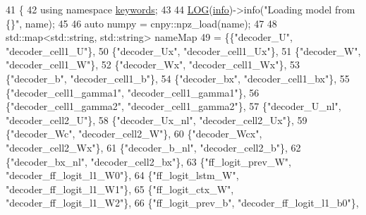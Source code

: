 \begin{DoxyCode}
41                                                                \{
42     \textcolor{keyword}{using namespace }\hyperlink{namespacekeywords}{keywords};
43 
44     \hyperlink{amun_2common_2logging_8h_a8cad147aca8c526d3c8a03ae14d5c87d}{LOG}(\hyperlink{namespacefix__hard_a31eedbb056537bc1bef47ad5e40eaa68}{info})->info(\textcolor{stringliteral}{"Loading model from \{\}"}, name);
45 
46     \textcolor{keyword}{auto} numpy = cnpy::npz\_load(name);
47 
48     std::map<std::string, std::string> nameMap
49         = \{\{\textcolor{stringliteral}{"decoder\_U"}, \textcolor{stringliteral}{"decoder\_cell1\_U"}\},
50            \{\textcolor{stringliteral}{"decoder\_Ux"}, \textcolor{stringliteral}{"decoder\_cell1\_Ux"}\},
51            \{\textcolor{stringliteral}{"decoder\_W"}, \textcolor{stringliteral}{"decoder\_cell1\_W"}\},
52            \{\textcolor{stringliteral}{"decoder\_Wx"}, \textcolor{stringliteral}{"decoder\_cell1\_Wx"}\},
53            \{\textcolor{stringliteral}{"decoder\_b"}, \textcolor{stringliteral}{"decoder\_cell1\_b"}\},
54            \{\textcolor{stringliteral}{"decoder\_bx"}, \textcolor{stringliteral}{"decoder\_cell1\_bx"}\},
55            \{\textcolor{stringliteral}{"decoder\_cell1\_gamma1"}, \textcolor{stringliteral}{"decoder\_cell1\_gamma1"}\},
56            \{\textcolor{stringliteral}{"decoder\_cell1\_gamma2"}, \textcolor{stringliteral}{"decoder\_cell1\_gamma2"}\},
57            \{\textcolor{stringliteral}{"decoder\_U\_nl"}, \textcolor{stringliteral}{"decoder\_cell2\_U"}\},
58            \{\textcolor{stringliteral}{"decoder\_Ux\_nl"}, \textcolor{stringliteral}{"decoder\_cell2\_Ux"}\},
59            \{\textcolor{stringliteral}{"decoder\_Wc"}, \textcolor{stringliteral}{"decoder\_cell2\_W"}\},
60            \{\textcolor{stringliteral}{"decoder\_Wcx"}, \textcolor{stringliteral}{"decoder\_cell2\_Wx"}\},
61            \{\textcolor{stringliteral}{"decoder\_b\_nl"}, \textcolor{stringliteral}{"decoder\_cell2\_b"}\},
62            \{\textcolor{stringliteral}{"decoder\_bx\_nl"}, \textcolor{stringliteral}{"decoder\_cell2\_bx"}\},
63            \{\textcolor{stringliteral}{"ff\_logit\_prev\_W"}, \textcolor{stringliteral}{"decoder\_ff\_logit\_l1\_W0"}\},
64            \{\textcolor{stringliteral}{"ff\_logit\_lstm\_W"}, \textcolor{stringliteral}{"decoder\_ff\_logit\_l1\_W1"}\},
65            \{\textcolor{stringliteral}{"ff\_logit\_ctx\_W"}, \textcolor{stringliteral}{"decoder\_ff\_logit\_l1\_W2"}\},
66            \{\textcolor{stringliteral}{"ff\_logit\_prev\_b"}, \textcolor{stringliteral}{"decoder\_ff\_logit\_l1\_b0"}\},

\end{DoxyCode}
